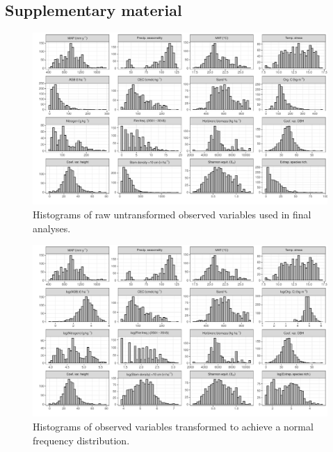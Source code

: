 \begin{refsection}
\section{Supplementary material}
\label{befr:sec:supp}

\begin{supplement}

\begin{figure}[H]
	\includegraphics[width=\linewidth]{img/hist_raw}
	\caption[Raw histograms of observed variables]{Histograms of raw untransformed observed variables used in final analyses.}
	\label{befr:hist_raw}
\end{figure}

\begin{figure}[H]
	\includegraphics[width=\linewidth]{img/hist_trans}
	\caption[Histograms of transformed observed variables]{Histograms of observed variables transformed to achieve a normal frequency distribution.}
	\label{befr:hist_trans}
\end{figure}




\end{supplement}
\end{refsection}
